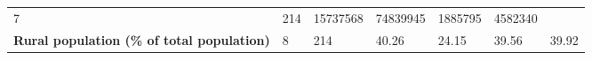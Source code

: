 \documentclass[
]{article}
\begin{document}
\begin{longtable}[]{@{}lllllll@{}}
\begin{minipage}[t]{0.08\columnwidth}
7\strut
\end{minipage} & \begin{minipage}[t]{0.07\columnwidth}\raggedright
214\strut
\end{minipage} & \begin{minipage}[t]{0.12\columnwidth}\raggedright
15737568\strut
\end{minipage} & \begin{minipage}[t]{0.12\columnwidth}\raggedright
74839945\strut
\end{minipage} & \begin{minipage}[t]{0.11\columnwidth}\raggedright
1885795\strut
\end{minipage} & \begin{minipage}[t]{0.11\columnwidth}\raggedright
4582340\strut
\end{minipage}\tabularnewline
\begin{minipage}[t]{0.19\columnwidth}\raggedright
\textbf{Rural population (\% of total population)}\strut
\end{minipage} & \begin{minipage}[t]{0.08\columnwidth}\raggedright
8\strut
\end{minipage} & \begin{minipage}[t]{0.07\columnwidth}\raggedright
214\strut
\end{minipage} & \begin{minipage}[t]{0.12\columnwidth}\raggedright
40.26\strut
\end{minipage} & \begin{minipage}[t]{0.12\columnwidth}\raggedright
24.15\strut
\end{minipage} & \begin{minipage}[t]{0.11\columnwidth}\raggedright
39.56\strut
\end{minipage} & \begin{minipage}[t]{0.11\columnwidth}\raggedright
39.92\strut
\end{minipage}\tabularnewline
\bottomrule
\end{longtable}
\end{document}
